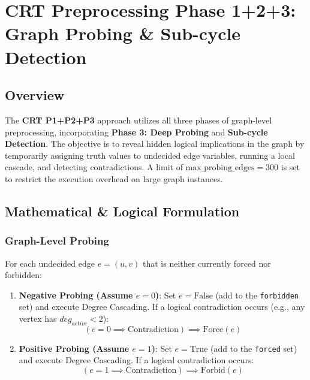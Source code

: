 \section{CRT Preprocessing Phase 1+2+3: Graph Probing \& Sub-cycle Detection}
\label{sec:crt_p1_p2_p3_probing}

\subsection{Overview}
The \textbf{CRT P1+P2+P3} approach utilizes all three phases of graph-level preprocessing, incorporating \textbf{Phase 3: Deep Probing} and \textbf{Sub-cycle Detection}.
The objective is to reveal hidden logical implications in the graph by temporarily assigning truth values to undecided edge variables, running a local cascade, and detecting contradictions.
A limit of $\text{max\_probing\_edges} = 300$ is set to restrict the execution overhead on large graph instances.

\subsection{Mathematical \& Logical Formulation}

\subsubsection{Graph-Level Probing}
For each undecided edge $e = (u,v)$ that is neither currently forced nor forbidden:
\begin{enumerate}
    \item \textbf{Negative Probing (Assume $e = 0$)}:
    Set $e = \text{False}$ (add to the \texttt{forbidden} set) and execute Degree Cascading.
    If a logical contradiction occurs (e.g., any vertex has $deg_{active} < 2$):
    \begin{equation}
        (e = 0 \implies \text{Contradiction}) \implies \text{Force}(e)
    \end{equation}
    \item \textbf{Positive Probing (Assume $e = 1$)}:
    Set $e = \text{True}$ (add to the \texttt{forced} set) and execute Degree Cascading.
    If a logical contradiction occurs:
    \begin{equation}
        (e = 1 \implies \text{Contradiction}) \implies \text{Forbid}(e)
    \end{equation}
\end{enumerate}

